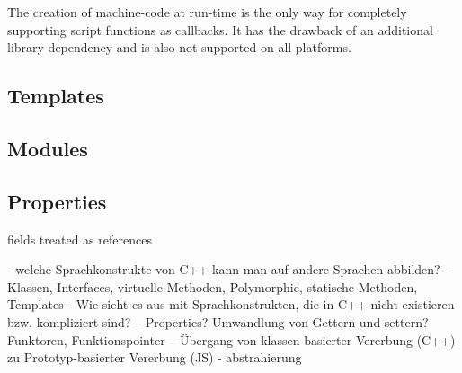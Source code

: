 The creation of machine-code at run-time is the only way for completely supporting script functions as callbacks. It has the drawback of an additional library dependency and is also not supported on all platforms.

\subsection{Templates}

\subsection{Modules}

\subsection{Properties}

fields treated as references







 - welche Sprachkonstrukte von C++ kann man auf andere Sprachen abbilden? 
 -- Klassen, Interfaces, virtuelle Methoden, Polymorphie, statische Methoden, Templates
 - Wie sieht es aus mit Sprachkonstrukten, die in C++ nicht existieren bzw. kompliziert sind?
 -- Properties? Umwandlung von Gettern und settern? Funktoren, Funktionspointer
 -- Übergang von klassen-basierter Vererbung (C++) zu Prototyp-basierter Vererbung (JS)
 - abstrahierung
